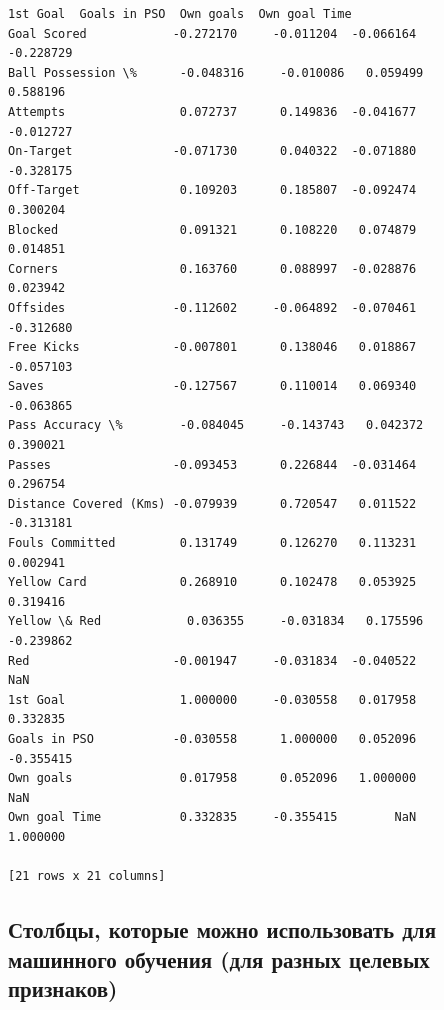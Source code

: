 \documentclass[11pt, a4paper]{report}
\begin{document}
\begin{tcolorbox}[breakable, size=fbox, boxrule=.5pt, pad at break*=1mm, opacityfill=0]
\begin{Verbatim}[commandchars=\\\{\}]
                        1st Goal  Goals in PSO  Own goals  Own goal Time
Goal Scored            -0.272170     -0.011204  -0.066164      -0.228729
Ball Possession \%      -0.048316     -0.010086   0.059499       0.588196
Attempts                0.072737      0.149836  -0.041677      -0.012727
On-Target              -0.071730      0.040322  -0.071880      -0.328175
Off-Target              0.109203      0.185807  -0.092474       0.300204
Blocked                 0.091321      0.108220   0.074879       0.014851
Corners                 0.163760      0.088997  -0.028876       0.023942
Offsides               -0.112602     -0.064892  -0.070461      -0.312680
Free Kicks             -0.007801      0.138046   0.018867      -0.057103
Saves                  -0.127567      0.110014   0.069340      -0.063865
Pass Accuracy \%        -0.084045     -0.143743   0.042372       0.390021
Passes                 -0.093453      0.226844  -0.031464       0.296754
Distance Covered (Kms) -0.079939      0.720547   0.011522      -0.313181
Fouls Committed         0.131749      0.126270   0.113231       0.002941
Yellow Card             0.268910      0.102478   0.053925       0.319416
Yellow \& Red            0.036355     -0.031834   0.175596      -0.239862
Red                    -0.001947     -0.031834  -0.040522            NaN
1st Goal                1.000000     -0.030558   0.017958       0.332835
Goals in PSO           -0.030558      1.000000   0.052096      -0.355415
Own goals               0.017958      0.052096   1.000000            NaN
Own goal Time           0.332835     -0.355415        NaN       1.000000

[21 rows x 21 columns]
\end{Verbatim}
\end{tcolorbox}
        
    \hypertarget{ux441ux442ux43eux43bux431ux446ux44b-ux43aux43eux442ux43eux440ux44bux435-ux43cux43eux436ux43dux43e-ux438ux441ux43fux43eux43bux44cux437ux43eux432ux430ux442ux44c-ux434ux43bux44f-ux43cux430ux448ux438ux43dux43dux43eux433ux43e-ux43eux431ux443ux447ux435ux43dux438ux44f-ux434ux43bux44f-ux440ux430ux437ux43dux44bux445-ux446ux435ux43bux435ux432ux44bux445-ux43fux440ux438ux437ux43dux430ux43aux43eux432}{%
\subsection{Столбцы, которые можно использовать для машинного обучения
(для разных целевых
признаков)}\label{ux441ux442ux43eux43bux431ux446ux44b-ux43aux43eux442ux43eux440ux44bux435-ux43cux43eux436ux43dux43e-ux438ux441ux43fux43eux43bux44cux437ux43eux432ux430ux442ux44c-ux434ux43bux44f-ux43cux430ux448ux438ux43dux43dux43eux433ux43e-ux43eux431ux443ux447ux435ux43dux438ux44f-ux434ux43bux44f-ux440ux430ux437ux43dux44bux445-ux446ux435ux43bux435ux432ux44bux445-ux43fux440ux438ux437ux43dux430ux43aux43eux432}}
\end{document}
